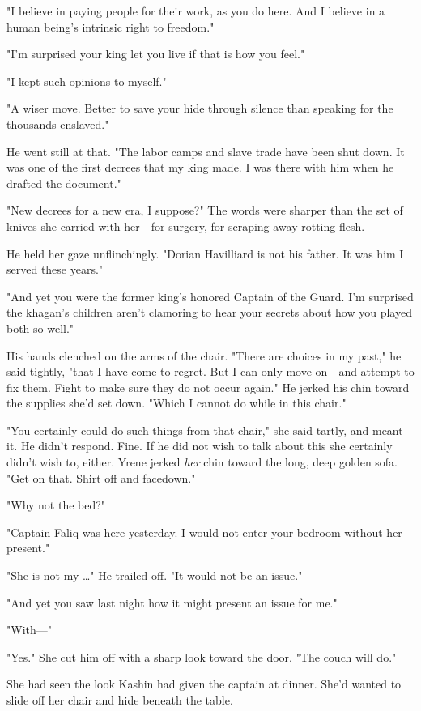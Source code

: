 "I believe in paying people for their work, as you do here. And I believe in a human being's intrinsic right to freedom."

"I'm surprised your king let you live if that is how you feel."

"I kept such opinions to myself."

"A wiser move. Better to save your hide through silence than speaking for the thousands enslaved."

He went still at that. "The labor camps and slave trade have been shut down. It was one of the first decrees that my king made. I was there with him when he drafted the document."

"New decrees for a new era, I suppose?" The words were sharper than the set of knives she carried with her---for surgery, for scraping away rotting flesh.

He held her gaze unflinchingly. "Dorian Havilliard is not his father. It was him I served these years."

"And yet you were the former king's honored Captain of the Guard. I'm surprised the khagan's children aren't clamoring to hear your secrets about how you played both so well."

His hands clenched on the arms of the chair. "There are choices in my past," he said tightly, "that I have come to regret. But I can only move on---and attempt to fix them. Fight to make sure they do not occur again." He jerked his chin toward the supplies she'd set down. "Which I cannot do while in this chair."

"You certainly could do such things from that chair," she said tartly, and meant it. He didn't respond. Fine. If he did not wish to talk about this  she certainly didn't wish to, either. Yrene jerked
\emph{her} chin toward the long, deep golden sofa. "Get on that. Shirt off and facedown."

"Why not the bed?"

"Captain Faliq was here yesterday. I would not enter your bedroom without her present."

"She is not my \ldots" He trailed off. "It would not be an issue."

"And yet you saw last night how it might present an issue for me."

"With---"

"Yes." She cut him off with a sharp look toward the door. "The couch will do."

She had seen the look Kashin had given the captain at dinner. She'd wanted to slide off her chair and hide beneath the table.

